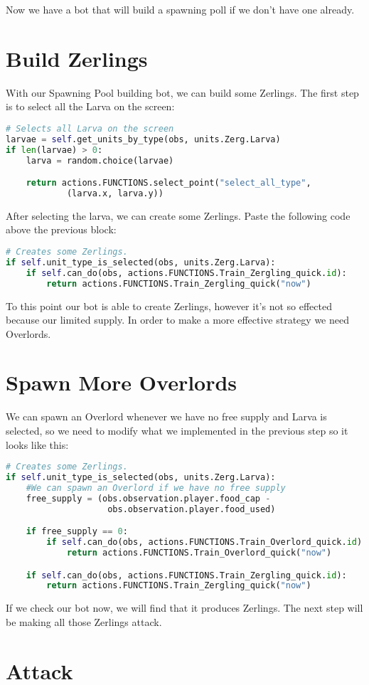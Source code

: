\documentclass[11pt]{report}            %
\begin{document}
Now we have a bot that will build a spawning poll if we don't have one already.

\section{Build Zerlings}
With our Spawning Pool building bot, we can build some Zerlings. The first step is to select all the Larva on the screen:
\begin{lstlisting}[language=Python]
# Selects all Larva on the screen
larvae = self.get_units_by_type(obs, units.Zerg.Larva)
if len(larvae) > 0:
    larva = random.choice(larvae)

    return actions.FUNCTIONS.select_point("select_all_type",
            (larva.x, larva.y))
\end{lstlisting}

After selecting the larva, we can create some Zerlings. Paste the following code above the previous block:
\begin{lstlisting}[language=Python]
# Creates some Zerlings.
if self.unit_type_is_selected(obs, units.Zerg.Larva):
    if self.can_do(obs, actions.FUNCTIONS.Train_Zergling_quick.id):
        return actions.FUNCTIONS.Train_Zergling_quick("now")
\end{lstlisting}
To this point our bot is able to create Zerlings, however it's not so effected because our limited supply. In order to make a more effective strategy we need Overlords.

\section{Spawn More Overlords}
We can spawn an Overlord whenever we have no free supply and Larva is selected, so we need to modify what we implemented in the previous step so it looks like this:
\begin{lstlisting}[language=Python]
# Creates some Zerlings.
if self.unit_type_is_selected(obs, units.Zerg.Larva):
    #We can spawn an Overlord if we have no free supply
    free_supply = (obs.observation.player.food_cap -
                    obs.observation.player.food_used)

    if free_supply == 0:
        if self.can_do(obs, actions.FUNCTIONS.Train_Overlord_quick.id):
            return actions.FUNCTIONS.Train_Overlord_quick("now")

    if self.can_do(obs, actions.FUNCTIONS.Train_Zergling_quick.id):
        return actions.FUNCTIONS.Train_Zergling_quick("now")
\end{lstlisting}

If we check our bot now, we will find that it produces Zerlings. The next step will be making all those Zerlings attack.

\section{Attack}
\end{document}
